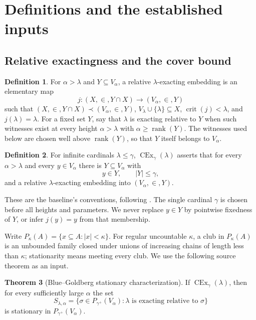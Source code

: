 \documentclass[11pt,letterpaper]{article}
\theoremstyle{definition}
\newtheorem{definition}{Definition}[section]
\newtheorem{theorem}[definition]{Theorem}
\newcommand{\CEx}{\operatorname{CEx}}
\newcommand{\crit}{\operatorname{crit}}
\newcommand{\rank}{\operatorname{rank}}
\numberwithin{equation}{section}
\begin{document}
\section{Definitions and the established inputs}\label{sec:definitions}

\subsection{Relative exactingness and the cover bound}

\begin{definition}\label{def:relative}
For $\alpha>\lambda$ and $Y\subseteq V_\alpha$, a relative $\lambda$-exacting embedding is an elementary map
\[
 j:(X,\in,Y\cap X)\longrightarrow(V_\alpha,\in,Y)
\]
such that $(X,\in,Y\cap X)\prec(V_\alpha,\in,Y)$,
$V_\lambda\cup\{\lambda\}\subseteq X$, $\crit(j)<\lambda$, and $j(\lambda)=\lambda$.
For a fixed set $Y$, say that $\lambda$ is exacting relative to $Y$ when such witnesses exist at every height $\alpha>\lambda$ with $\alpha\geq\rank(Y)$. The witnesses used below are chosen well above $\rank(Y)$, so that $Y$ itself belongs to $V_\alpha$.
\end{definition}

\begin{definition}\label{def:cover}
For infinite cardinals $\lambda\leq\gamma$, $\CEx_\gamma(\lambda)$ asserts that for every $\alpha>\lambda$ and every $y\in V_\alpha$ there is $Y\subseteq V_\alpha$ with
\[
 y\in Y,\qquad |Y|\leq\gamma,
\]
and a relative $\lambda$-exacting embedding into $(V_\alpha,\in,Y)$.
\end{definition}

These are the baseline's conventions, following \cite[Definitions~2.6, 3.1--3.2]{cover}. The single cardinal $\gamma$ is chosen before all heights and parameters. We never replace $y\in Y$ by pointwise fixedness of $Y$, or infer $j(y)=y$ from that membership.

Write $P_\kappa(A)=\{x\subseteq A:|x|<\kappa\}$. For regular uncountable $\kappa$, a club in $P_\kappa(A)$ is an unbounded family closed under unions of increasing chains of length less than $\kappa$; stationarity means meeting every club. We use the following source theorem as an input.

\begin{theorem}[Blue--Goldberg stationary characterization]\label{thm:stationary}
If $\CEx_\gamma(\lambda)$, then for every sufficiently large $\alpha$ the set
\begin{equation}\label{eq:stationary}
 S_{\lambda,\alpha}=
 \{\sigma\in P_{\gamma^+}(V_\alpha):
                \lambda\text{ is exacting relative to }\sigma\}
\end{equation}
is stationary in $P_{\gamma^+}(V_\alpha)$.
\end{theorem}
\end{document}
